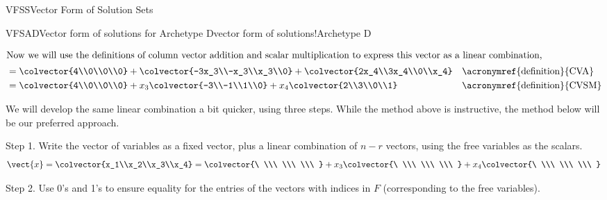 \begin{subsect}{VFSS}{Vector Form of Solution Sets}
\begin{example}{VFSAD}{Vector form of solutions for Archetype D}{vector form of solutions!Archetype D}
\begin{para}
\begin{align*}
%
\intertext{Now we will use the definitions of column vector addition and scalar multiplication to express this vector as a linear combination,}
&=\colvector{4\\0\\0\\0}+
\colvector{-3x_3\\-x_3\\x_3\\0}+
\colvector{2x_4\\3x_4\\0\\x_4}&&\text{\acronymref{definition}{CVA}}\\
%
&=\colvector{4\\0\\0\\0}+
x_3\colvector{-3\\-1\\1\\0}+
x_4\colvector{2\\3\\0\\1}&&\text{\acronymref{definition}{CVSM}}\\
%
\end{align*}
\end{para}
%
\begin{para}We will develop the same linear combination a bit quicker, using three steps.  While the method above is instructive, the method below will be our preferred approach.\end{para}
%
\begin{para}Step 1.  Write the vector of variables as a fixed vector, plus a linear combination of $n-r$ vectors, using the free variables as the scalars.
%
\begin{equation*}
\vect{x}=\colvector{x_1\\x_2\\x_3\\x_4}=
\colvector{\ \\\ \\\ \\\ }+x_3\colvector{\ \\\ \\\ \\\ }+x_4\colvector{\ \\\ \\\ \\\ }
\end{equation*}
\end{para}
%
\begin{para}Step 2.  Use 0's and 1's to ensure equality for the  entries of the vectors with indices in $F$ (corresponding to the free variables).

\end{para}
\end{example}
\end{subsect}
